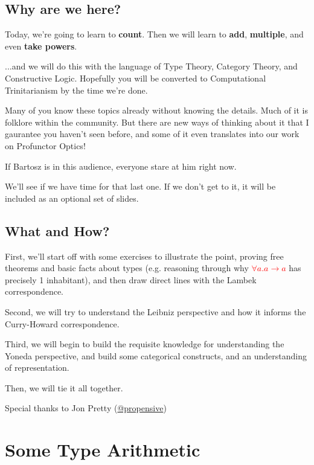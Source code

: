 \documentclass[tikz]{beamer}
\newcommand{\red}[1]{\textcolor{red}{#1}}
\theoremstyle{definition}
\begin{document}
\subsection{Why are we here?}

\frame
{ 
	Today, we're going to learn to \textbf{count}. Then we will learn to \textbf{add}, \textbf{multiple}, and even \textbf{take powers}. 
}

\frame
{ 
	...and we will do this with the language of Type Theory, Category Theory, and Constructive Logic. Hopefully you will be converted to Computational Trinitarianism by the time we're done.
}

\frame
{ 
	Many of you know these topics already without knowing the details. Much of it is folklore within the community. But there are new ways of thinking about it that I gaurantee you haven't seen before, and some of it even translates into our work on Profunctor Optics! 
}

\frame
{ 
	If Bartosz is in this audience, everyone stare at him right now. 
}

\frame
{ 
	We'll see if we have time for that last one. If we don't get to it, it will be included as an optional set of slides. 
}

\subsection{What and How?}

\frame
{ 
	First, we'll start off with some exercises to illustrate the point, proving free theorems and basic facts about types (e.g. reasoning through why \red{$\forall a. a \to a$} has precisely 1 inhabitant), and then draw direct lines with the Lambek correspondence. 
}

\frame
{ 
	Second, we will try to understand the Leibniz perspective and how it informs the Curry-Howard correspondence. 
}

\frame
{ 
	Third, we will begin to build the requisite knowledge for understanding the Yoneda perspective, and build some categorical constructs, and an understanding of representation. 
}

\frame
{ 
	Then, we will tie it all together. 
}

\frame
{ 
	Special thanks to Jon Pretty (\href{https://twitter.com/propensive}{@propensive})
}

\section{Some Type Arithmetic}
\end{document}

